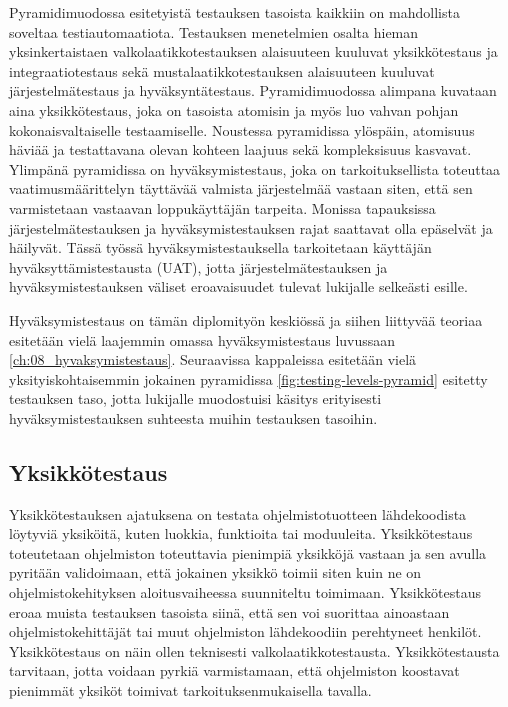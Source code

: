   Pyramidimuodossa esitetyistä testauksen tasoista kaikkiin on mahdollista soveltaa testiautomaatiota.
  Testauksen menetelmien osalta hieman yksinkertaistaen valkolaatikkotestauksen alaisuuteen kuuluvat yksikkötestaus ja integraatiotestaus sekä mustalaatikkotestauksen alaisuuteen kuuluvat järjestelmätestaus ja hyväksyntätestaus.
  Pyramidimuodossa alimpana kuvataan aina yksikkötestaus, joka on tasoista atomisin ja myös luo vahvan pohjan kokonaisvaltaiselle testaamiselle.
  Noustessa pyramidissa ylöspäin, atomisuus häviää ja testattavana olevan kohteen laajuus sekä kompleksisuus kasvavat.
  Ylimpänä pyramidissa on hyväksymistestaus, joka on tarkoituksellista toteuttaa vaatimusmäärittelyn täyttävää valmista järjestelmää vastaan siten, että sen varmistetaan vastaavan loppukäyttäjän tarpeita.
  Monissa tapauksissa järjestelmätestauksen ja hyväksymistestauksen rajat saattavat olla epäselvät ja häilyvät.
  Tässä työssä hyväksymistestauksella tarkoitetaan käyttäjän hyväksyttämistestausta (UAT), jotta järjestelmätestauksen ja hyväksymistestauksen väliset eroavaisuudet tulevat lukijalle selkeästi esille.

  Hyväksymistestaus on tämän diplomityön keskiössä ja siihen liittyvää teoriaa esitetään vielä laajemmin omassa hyväksymistestaus luvussaan \ref{ch:08_hyvaksymistestaus}.
  Seuraavissa kappaleissa esitetään vielä yksityiskohtaisemmin jokainen pyramidissa \ref{fig:testing-levels-pyramid} esitetty testauksen taso, jotta lukijalle muodostuisi käsitys erityisesti hyväksymistestauksen suhteesta muihin testauksen tasoihin.

  \subsection{Yksikkötestaus} \label{ch:07_yksikkotestaus}

    Yksikkötestauksen ajatuksena on testata ohjelmistotuotteen lähdekoodista löytyviä yksiköitä, kuten luokkia, funktioita tai moduuleita.
    Yksikkötestaus toteutetaan ohjelmiston toteuttavia pienimpiä yksikköjä vastaan ja sen avulla pyritään validoimaan, että jokainen yksikkö toimii siten kuin ne on ohjelmistokehityksen aloitusvaiheessa suunniteltu toimimaan.
    Yksikkötestaus eroaa muista testauksen tasoista siinä, että sen voi suorittaa ainoastaan ohjelmistokehittäjät tai muut ohjelmiston lähdekoodiin perehtyneet henkilöt.
    Yksikkötestaus on näin ollen teknisesti valkolaatikkotestausta.
    Yksikkötestausta tarvitaan, jotta voidaan pyrkiä varmistamaan, että ohjelmiston koostavat pienimmät yksiköt toimivat tarkoituksenmukaisella tavalla.

